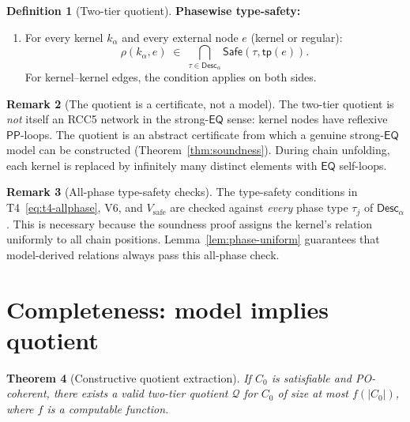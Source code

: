 \documentclass[a4paper,11pt]{article}
\newtheorem{theorem}{Theorem}[section]
\theoremstyle{definition}
\newtheorem{definition}[theorem]{Definition}
\newtheorem{remark}[theorem]{Remark}
\newcommand{\EQ}{\ensuremath{\mathsf{EQ}}}
\newcommand{\PP}{\ensuremath{\mathsf{PP}}}
\newcommand{\tp}{\ensuremath{\mathsf{tp}}}
\newcommand{\Desc}{\ensuremath{\mathsf{Desc}}}
\newcommand{\Safe}{\ensuremath{\mathsf{Safe}}}
\begin{document}
\begin{definition}[Two-tier quotient]
\medskip\noindent\textbf{Phasewise type-safety:}
\begin{enumerate}[label=($V_{\mathrm{safe}}$)]
\item For every kernel $k_\alpha$ and every
  external node $e$ (kernel or regular):
  \[
  \rho(k_\alpha, e) \;\in\;
    \bigcap_{\tau \in \Desc_\alpha}
    \Safe(\tau, \tp(e)).
  \]
  For kernel--kernel edges, the condition applies on both sides.
\end{enumerate}
\end{definition}

\begin{remark}[The quotient is a certificate, not a model]
\label{rem:certificate}
The two-tier quotient is \emph{not} itself an RCC5 network in the
strong-$\EQ$ sense: kernel nodes have reflexive $\PP$-loops.
The quotient is an abstract certificate from which a genuine
strong-$\EQ$ model can be constructed
(Theorem~\ref{thm:soundness}).  During chain unfolding, each
kernel is replaced by infinitely many distinct elements with $\EQ$
self-loops.
\end{remark}

\begin{remark}[All-phase type-safety checks]
\label{rem:allphase}
The type-safety conditions in T4~\eqref{eq:t4-allphase}, V6,
and $V_{\mathrm{safe}}$ are checked against \emph{every} phase type
$\tau_j$ of $\Desc_\alpha$.  This is necessary because the
soundness proof assigns the kernel's relation uniformly to all chain
positions.  Lemma~\ref{lem:phase-uniform} guarantees that
model-derived relations always pass this all-phase check.
\end{remark}


\section{Completeness: model implies quotient}
\label{sec:completeness}

\begin{theorem}[Constructive quotient extraction]
\label{thm:completeness}
If $C_0$ is satisfiable and PO-coherent, there exists a valid
two-tier quotient $\mathcal{Q}$ for $C_0$ of size at most
$f(|C_0|)$, where $f$ is a computable function.
\end{theorem}
\end{document}
